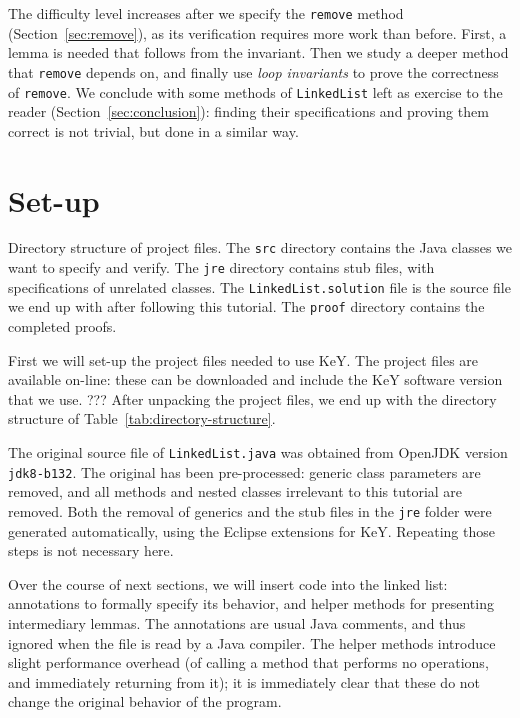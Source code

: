 \documentclass[runningheads]{llncs}
\begin{document}
The difficulty level increases after we specify the \texttt{remove} method (Section~\ref{sec:remove}), as its verification requires more work than before. First, a lemma is needed that follows from the invariant. Then we study a deeper method that \texttt{remove} depends on, and finally use \emph{loop invariants} to prove the correctness of \texttt{remove}. We conclude with some methods of \texttt{LinkedList} left as exercise to the reader (Section~\ref{sec:conclusion}): finding their specifications and proving them correct is not trivial, but done in a similar way.

\section{Set-up}\label{sec:setup}

\begin{table}
\medskip
    \caption{Directory structure of project files. The \texttt{src} directory contains the Java classes we want to specify and verify. The \texttt{jre} directory contains stub files, with specifications of unrelated classes. The \texttt{LinkedList.solution} file is the source file we end up with after following this tutorial. The \texttt{proof} directory contains the completed proofs.}
    \vspace*{-20pt}
    \label{tab:directory-structure}
\end{table}

First we will set-up the project files needed to use KeY. The project files are available on-line: these can be downloaded and include the KeY software version that we use. ??? After unpacking the project files, we end up with the directory structure of Table~\ref{tab:directory-structure}.

The original source file of \texttt{LinkedList.java} was obtained from OpenJDK version \texttt{jdk8-b132}. The original has been pre-processed: generic class parameters are removed, and all methods and nested classes irrelevant to this tutorial are removed. Both the removal of generics and the stub files in the \texttt{jre} folder were generated automatically, using the Eclipse extensions for KeY. Repeating those steps is not necessary here.

Over the course of next sections, we will insert code into the linked list: annotations to formally specify its behavior, and helper methods for presenting intermediary lemmas. The annotations are usual Java comments, and thus ignored when the file is read by a Java compiler. The helper methods introduce slight performance overhead (of calling a method that performs no operations, and immediately returning from it); it is immediately clear that these do not change the original behavior of the program.
\end{document}
